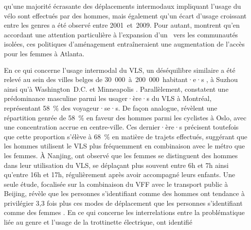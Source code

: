 \begin{refsegment}
qu'une majorité écrasante des déplacements intermodaux impliquant l'usage du vélo sont effectués par des hommes, mais également qu'un écart d'usage croissant entre les genres a été observé entre 2001~et~2009. Pour autant, \textcolor{blue}{\textcite[59]{bearn_adaption_2018}} montrent qu'en accordant une attention particulière à l'expansion d'un ~vers les communautés isolées, ces politiques d'aménagement entraîneraient une augmentation de l'accès pour les femmes à Atlanta.%

En ce qui concerne l'usage intermodal du \acrshort{VLS}, un déséquilibre similaire a été relevé au sein des villes belges de 30~000~à~200~000~habitant·e·s \textcolor{blue}{\autocite[6]{adnan_last-mile_2019}}, à Suzhou \textcolor{blue}{\autocite[9]{ma_measuring_2018}} ainsi qu'à Washington~D.C. et Minneapolis \textcolor{blue}{\autocite[322]{martin_evaluating_2014}}. Parallèlement, \textcolor{blue}{\textcite[111]{bachand-marleau_much-anticipated_2011}} constatent une prédominance masculine parmi les usager·ère·s du \acrshort{VLS} à Montréal, représentant 58~\% des voyageur·se·s. De façon analogue, \textcolor{blue}{\textcite[393]{bocker_bike_2020}} révèlent une répartition genrée de 58~\% en faveur des hommes parmi les cyclistes à Oslo, avec une concentration accrue en centre-ville. Ces dernier·ère·s précisent toutefois que cette proportion s'élève à 68~\% en matière de trajets effectués, suggérant que les hommes utilisent le \acrshort{VLS} plus fréquemment en combinaison avec le métro que les femmes. À Nanjing, \textcolor{blue}{\textcite[64]{ma_understanding_2018}} ont observé que les femmes se distinguent des hommes dans leur utilisation du \acrshort{VLS}, se déplaçant plus souvent entre 6h et 7h ainsi qu'entre 16h et 17h, régulièrement après avoir accompagné leurs enfants. Une seule étude, focalisée sur la combinaison du \acrshort{VFF} avec le transport public à Beijing, révèle que les personnes s'identifiant comme des hommes ont tendance à privilégier 3,3 fois plus ces modes de déplacement que les personnes s'identifiant comme des femmes \textcolor{blue}{\autocite[10]{fan_how_2019}}. En ce qui concerne les interrelations entre la problématique liée au genre et l'usage de la trottinette électrique, \textcolor{blue}{\textcite[12]{pages_nouveaux_2021}} ont identifié 
\end{refsegment}
